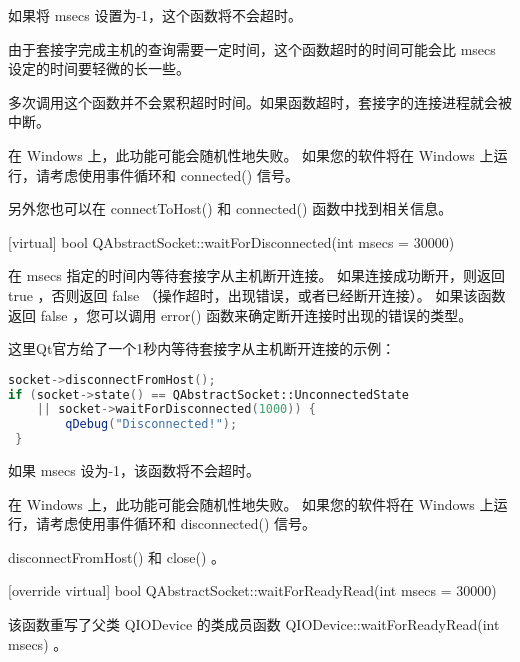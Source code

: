 如果将 msecs 设置为-1，这个函数将不会超时。

\begin{notice}
由于套接字完成主机的查询需要一定时间，这个函数超时的时间可能会比 msecs 设定的时间要轻微的长一些。
\end{notice}


\begin{notice}
多次调用这个函数并不会累积超时时间。如果函数超时，套接字的连接进程就会被中断。
\end{notice}

\begin{notice}
在 Windows 上，此功能可能会随机性地失败。 如果您的软件将在 Windows 上运行，请考虑使用事件循环和 connected() 信号。
\end{notice}

另外您也可以在 connectToHost() 和 connected() 函数中找到相关信息。

\splitLine

[virtual] bool QAbstractSocket::waitForDisconnected(int msecs = 30000)

在 msecs 指定的时间内等待套接字从主机断开连接。 如果连接成功断开，则返回 true ，否则返回 false （操作超时，出现错误，或者已经断开连接）。 如果该函数返回 false ，您可以调用 error() 函数来确定断开连接时出现的错误的类型。

这里Qt官方给了一个1秒内等待套接字从主机断开连接的示例：

\begin{lstlisting}[language=C++]
socket->disconnectFromHost();
if (socket->state() == QAbstractSocket::UnconnectedState
	|| socket->waitForDisconnected(1000)) {
		qDebug("Disconnected!");
 }
\end{lstlisting}

如果 msecs 设为-1，该函数将不会超时。

\begin{notice}
在 Windows 上，此功能可能会随机性地失败。 如果您的软件将在 Windows 上运行，请考虑使用事件循环和 disconnected() 信号。
\end{notice}




\begin{notice}[另请查阅]
disconnectFromHost() 和 close() 。
\end{notice}

\splitLine

[override virtual] bool QAbstractSocket::waitForReadyRead(int msecs =
30000)

该函数重写了父类 QIODevice 的类成员函数 QIODevice::waitForReadyRead(int msecs) 。

